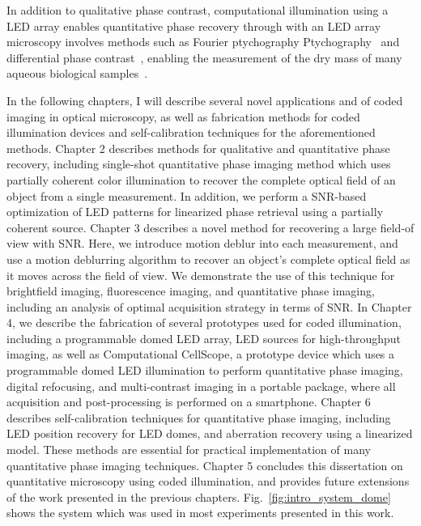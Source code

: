In addition to qualitative phase contrast, computational illumination using a LED array enables quantitative phase recovery through with an LED array microscopy involves methods such as Fourier ptychography Ptychography~\cite{Zheng2013, Tian14} and differential phase contrast~\cite{mehta2009quantitative,
tian2015quantitative}, enabling the measurement of the dry mass of many aqueous biological samples~\cite{popescu2008imaging, popescu2008optical}. 

In the following chapters, I will describe several novel applications and of coded imaging in optical microscopy, as well as fabrication methods for coded illumination devices and self-calibration techniques for the aforementioned methods. Chapter 2 describes methods for qualitative and quantitative phase recovery, including single-shot quantitative phase imaging method which uses partially coherent color illumination to recover the complete optical field of an object from a single measurement. In addition, we perform a SNR-based optimization of LED patterns for linearized phase retrieval using a partially coherent source. Chapter 3 describes a novel method for recovering a large field-of view with SNR. Here, we introduce motion deblur into each measurement, and use a motion deblurring algorithm to recover an object's complete optical field as it moves across the field of view. We demonstrate the use of this technique for brightfield imaging, fluorescence imaging, and quantitative phase imaging, including an analysis of optimal acquisition strategy in terms of SNR. In Chapter 4, we describe the fabrication of several prototypes used for coded illumination, including a programmable domed LED array, LED sources for high-throughput imaging, as well as Computational CellScope, a prototype device which uses a programmable domed LED illumination to perform quantitative phase imaging, digital refocusing, and multi-contrast imaging in a portable package, where all acquisition and post-processing is performed on a smartphone. Chapter 6 describes self-calibration techniques for quantitative phase imaging, including LED position recovery for LED domes, and aberration recovery using a linearized model. These methods are essential for practical implementation of many quantitative phase imaging techniques. Chapter 5 concludes this dissertation on quantitative microscopy using coded illumination, and provides future extensions of the work presented in the previous chapters. Fig.~\ref{fig:intro_system_dome} shows the system which was used in most experiments presented in this work.

